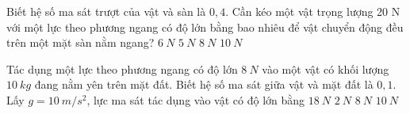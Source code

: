 \begin{vidu}%
Biết hệ số ma sát trượt của vật và sàn là $0,4$. Cần kéo một vật trọng lượng 20 N với một lực theo phương ngang có độ lớn bằng bao nhiêu để vật chuyển động đều trên một mặt sàn nằm ngang? 
\choice
{$6\ N$}
{$5\ N$}
{\True $8\ N$}
{$10\ N$}
 \end{vidu}
\begin{vidu}%
Tác dụng một lực theo phương ngang có độ lớn $8\ N$ vào một vật có khối lượng $10\ kg$ đang nằm yên trên mặt đất. Biết hệ số ma sát giữa vật và mặt đất là $0,1$. Lấy $g = 10\ m/s^2$, lực ma sát tác dụng vào vật có độ lớn bằng
\choice
{$18\ N$}
{$2\ N$}
{\True $8\ N$}
{$10\ N$}
 \end{vidu}

